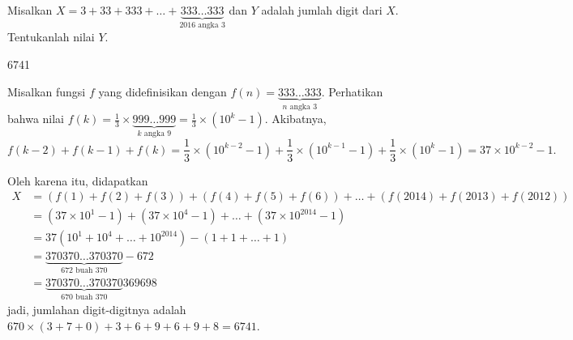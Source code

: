\documentclass[12pt]{scrartcl}
\begin{document}
	\begin{soaljawab}
		Misalkan $X = 3 + 33 + 333 + \dots + \underbrace{333 \dots 333}_{2016 \text{ angka } 3}$ dan $Y$ adalah jumlah digit dari $X$. Tentukanlah nilai $Y$.
		
		\begin{jawaban}
		6741
		\end{jawaban}
		\begin{solusi}
		Misalkan fungsi $f$ yang didefinisikan dengan $f(n)=\underbrace{333\dots 333}_{n \text{ angka } 3}$. Perhatikan bahwa nilai $f(k)=\frac{1}{3}\times \underbrace{999 \dots 999}_{k \text{ angka } 9} = \frac{1}{3}\times (10^k-1)$. Akibatnya, $$f(k-2)+f(k-1)+f(k)=\frac{1}{3}\times (10^{k-2}-1)+\frac{1}{3}\times (10^{k-1}-1)+\frac{1}{3}\times (10^k-1)=37\times 10^{k-2}-1.$$
		
		Oleh karena itu, didapatkan 
		\begin{align*}
		X &= (f(1)+f(2)+f(3))+(f(4)+f(5)+f(6))+\dots+(f(2014)+f(2013)+f(2012)) \\
		&= (37 \times 10^1 -1)+(37 \times 10^4 -1)+ \dots + (37 \times 10^{2014}-1)\\
		&= 37(10^1+10^4+\dots+10^{2014})-(1+1+\dots+1)\\
		&= \underbrace{370370\dots 370370}_{672 \text{ buah } 370} - 672\\
		&= \underbrace{370370\dots 370370}_{670 \text{ buah } 370}369698
		\end{align*}
		jadi, jumlahan digit-digitnya adalah $670 \times (3+7+0)+3+6+9+6+9+8=6741$.
		\end{solusi}
		
		
	\end{soaljawab}
	
	
	
\end{document}
